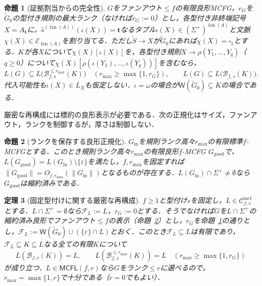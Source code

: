 \documentclass[11pt,a4paper]{ltjsarticle}
\numberwithin{equation}{section}
\theoremstyle{plain}
\newtheorem{theorem}{定理}[section]
\newtheorem{proposition}[theorem]{命題}
\theoremstyle{definition}
\theoremstyle{remark}
\newcommand{\Wit}{\mathsf{W}}
\newcommand{\Cmcf}[2]{\mathcal{C}^{\mathrm{mcf}}_{#1,#2}}
\newcommand{\blank}{\square}
\newcommand{\eps}{\varepsilon}
\newcommand{\fan}{\operatorname{fan}}
\begin{document}
\begin{proposition}[証拠割当からの完全性]
\label{prop:completeness}
$G$をファンアウト$\le f$の有限良形MCFG，$r_G$を$\widetilde G_0$の型付き規則の最大ランク（なければ$r_G:=0$）とし，各型付き非終端記号$X=A_{\mathbf t}$に，$\widehat s^{(\fan(A))}(\iota(X))=\mathbf t$なるタプル$\iota(X)\in(\Sigma^+)^{\fan(A)}$と文脈$\chi(X)\in\mathcal E_{\fan(A)}$を割り当てる．ただし$\widetilde S\to X$が$\widetilde G_0$にあれば$\chi(X)=\blank_1$とする．$K$が各$X$について$\chi(X)[\iota(X)]$を，各型付き規則$X\to\rho(Y_1,\ldots,Y_q)$（$q\ge0$）について$\chi(X)[\rho(\iota(Y_1),\ldots,\iota(Y_q))]$を含むなら，
\[
 L(G)\subseteq L\bigl(\mathcal B_{f,s}^{\le r_{\max}}(K)\bigr)
 \quad(r_{\max}\ge\max\{1,r_G\}),\qquad
 L(G)\subseteq L\bigl(\mathcal B_{f,s}(K)\bigr).
\]
代入可能性も$\iota(X)\in L_X$も仮定しない．$\iota=\omega$の場合が$\Wit(\widetilde G_0)\subseteq K$の場合である．
\end{proposition}

厳密な再構成には標的の良形表示が必要である．次の正規化はサイズ，ファンアウト，ランクを制御するが，厚さは制御しない．

\begin{proposition}[ランクを保存する良形正規化]
\label{prop:good-normalization}
$G_{\mathrm{in}}$を規則ランク高々$r_{\max}$の有限標準$f$-MCFGとする．このとき規則ランク高々$r_{\max}$の有限良形$f$-MCFG $G_{\mathrm{good}}$で，$L(G_{\mathrm{good}})=L(G_{\mathrm{in}})\setminus\{\eps\}$を満たし，$f,r_{\max}$を固定すれば$\|G_{\mathrm{good}}\|=O_{f,r_{\max}}(\|G_{\mathrm{in}}\|)$となるものが存在する．$L(G_{\mathrm{in}})\cap\Sigma^+\ne\emptyset$なら$G_{\mathrm{good}}$は縮約済みである．
\end{proposition}

\begin{theorem}[固定型付けに関する厳密な再構成]
\label{thm:exact-reconstruction}
$f\ge1$と型付け$s$を固定し，$L\in\Cmcf{f}{s}$とする．$L\cap\Sigma^+=\emptyset$なら$\mathcal F_L:=L$，$r_G:=0$とする．そうでなければ$G$を$L\cap\Sigma^+$の縮約済み良形でファンアウト$\le f$の表示（命題~\ref{prop:good-normalization}）とし，$r_G$を命題~\ref{prop:completeness}の通りとし，$\mathcal F_L:=\Wit(\widetilde G_0)\cup(\{\eps\}\cap L)$とおく．このとき$\mathcal F_L\subseteq L$は有限であり，$\mathcal F_L\subseteq K\subseteq L$なる全ての有限$K$について
\[
 L(\mathcal B_{f,s}(K))=L,\qquad
 L(\mathcal B_{f,s}^{\le r_{\max}}(K))=L\quad
 (r_{\max}\ge\max\{1,r_G\})
\]
が成り立つ．$L\in\mathsf{MCFL}(f,r)$なら$G$をランク$\le r$に選べるので，$r_{\max}=\max\{1,r\}$で十分である（$r=0$でもよい）．
\end{theorem}
\end{document}
